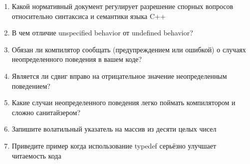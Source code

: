 \documentclass[a4paper,12pt,oneside]{article}
\newif\ifanswers
\begin{document}
\begin{enumerate}
\item Какой нормативный документ регулирует разрешение спорных вопросов относительно синтаксиса и семантики языка C++

\ifanswers
Ответ: стандарт языка и TR's. Стандарт является главным в том смысле, что любая реализация не соответствующая стандарту это баг на компилятор или на библиотеку
\fi

\item В чем отличие unspecified behavior от undefined behavior?

\ifanswers
Ответ: unspecified behavior, хотя и не специфицировано, но совершенно корректно. Компилятор обязан сгенерировать код с правильным порядком побочных эффектов (хотя может быть более чем один правильный порядок). Неопределенное поведение это опаньки.
\fi

\item Обязан ли компилятор сообщать (предупреждением или ошибкой) о случаях неопределенного поведения в вашем коде?

\ifanswers
Ответ: нет. Даже более того, о некоторых случаях он и не может сообщить, так как не все случаи неопределенного поведения могут быть статически доказаны.
\fi

\item Является ли сдвиг вправо на отрицательное значение неопределенным поведением?

\ifanswers
Ответ: да, это явно прописано в стандарте. Но даже с точки зрения здравого смысла: вы правда хотите, чтобы при каждом сдвиге вправо на неопределенное значение компилятор вставлял рантайм-проверку, что оно не отрицательное?
\fi

\item Какие случаи неопределенного поведения легко поймать компилятором и сложно санитайзером? 

\ifanswers
Ответ: любое структурное UB. Например отсутствие пустой строки в конце текстового файла с кодом. Или условие времени выполнения в директиве препроцессора. Хотел бы я посмотреть на санитайзер, который такое ловит.
\fi

\item Запишите волатильный указатель на массив из десяти целых чисел

\ifanswers
Ответ: \lstinline!int (* volatile pv) [10]! критично положение слова volatile.
\fi

\item Приведите пример когда использование typedef серьёзно улучшает читаемость кода


\end{enumerate}
\end{document}
